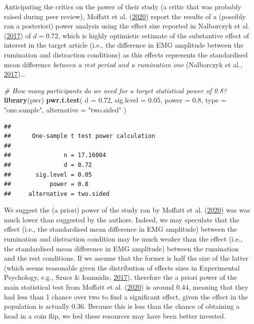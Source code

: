 \documentclass[
  english,
  man,floatsintext]{apa6}
\newenvironment{Shaded}{\begin{snugshade}}{\end{snugshade}}
\newcommand{\CommentTok}[1]{\textcolor[rgb]{0.56,0.35,0.01}{\textit{#1}}}
\newcommand{\DataTypeTok}[1]{\textcolor[rgb]{0.13,0.29,0.53}{#1}}
\newcommand{\FloatTok}[1]{\textcolor[rgb]{0.00,0.00,0.81}{#1}}
\newcommand{\KeywordTok}[1]{\textcolor[rgb]{0.13,0.29,0.53}{\textbf{#1}}}
\newcommand{\NormalTok}[1]{#1}
\newcommand{\StringTok}[1]{\textcolor[rgb]{0.31,0.60,0.02}{#1}}
\begin{document}
Anticipating the critics on the power of their study (a critic that was probably raised during peer review), Moffatt et al. (\protect\hyperlink{ref-moffatt_inner_2020}{2020}) report the results of a (possibly ran a posteriori) power analysis using the effect size reported in Nalborczyk et al. (\protect\hyperlink{ref-nalborczyk_orofacial_2017}{2017}) of \(d = 0.72\), which is highly optimistic estimate of the substantive effect of interest in the target article (i.e., the difference in EMG amplitude between the rumination and distraction conditions) as this effects represents the standardised mean difference \emph{between a rest period and a rumination one} (Nalborczyk et al., \protect\hyperlink{ref-nalborczyk_orofacial_2017}{2017})\ldots{}

\begin{Shaded}
\begin{Highlighting}[]
\CommentTok{\# How many participants do we need for a target statistical power of 0.8?}
\KeywordTok{library}\NormalTok{(pwr)}
\KeywordTok{pwr.t.test}\NormalTok{(}
  \DataTypeTok{d =} \FloatTok{0.72}\NormalTok{, }\DataTypeTok{sig.level =} \FloatTok{0.05}\NormalTok{, }\DataTypeTok{power =} \FloatTok{0.8}\NormalTok{,}
  \DataTypeTok{type =} \StringTok{"one.sample"}\NormalTok{, }\DataTypeTok{alternative =} \StringTok{"two.sided"}
\NormalTok{  )}
\end{Highlighting}
\end{Shaded}

\begin{verbatim}
## 
##      One-sample t test power calculation 
## 
##               n = 17.16004
##               d = 0.72
##       sig.level = 0.05
##           power = 0.8
##     alternative = two.sided
\end{verbatim}

We suggest the (a priori) power of the study ran by Moffatt et al. (\protect\hyperlink{ref-moffatt_inner_2020}{2020}) was was much lower than suggested by the authors. Indeed, we may speculate that the effect (i.e., the standardised mean difference in EMG amplitude) between the rumination and distraction condition may be much weaker than the effect (i.e., the standardised mean difference in EMG amplitude) between the rumination and the rest conditions. If we assume that the former is half the size of the latter (which seems reasonable given the distribution of effects sizes in Experimental Psychology, e.g., Szucs \& Ioannidis, \protect\hyperlink{ref-szucs_empirical_2017}{2017}), therefore the a priori power of the main statistical test from Moffatt et al. (\protect\hyperlink{ref-moffatt_inner_2020}{2020}) is around \(0.44\), meaning that they had less than 1 chance over two to find a significant effect, given the effect in the population is actually \(0.36\). Because this is less than the chance of obtaining a head in a coin flip, we feel these resources may have been better invested.
\end{document}
